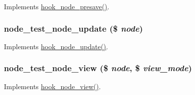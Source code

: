 \label{node__test_8module_a5dc9a5a8b514e3717ac1533d79fa0077}
Implements \hyperlink{group__node__api__hooks_gab339b1a1ce0e235d4a9c5a05e410dcd6}{hook\_\-node\_\-presave()}. \hypertarget{node__test_8module_a5db97f3455d3967072e99ff4275327e9}{
\subsubsection[{node\_\-test\_\-node\_\-update}]{\setlength{\rightskip}{0pt plus 5cm}node\_\-test\_\-node\_\-update (\$ {\em node})}}
\label{node__test_8module_a5db97f3455d3967072e99ff4275327e9}
Implements \hyperlink{group__node__api__hooks_gac66c767cc922fcbfdaf17252e5d87d9d}{hook\_\-node\_\-update()}. \hypertarget{node__test_8module_a7a0e0b7d9827ab5e62af39ecc0c3c0fd}{
\subsubsection[{node\_\-test\_\-node\_\-view}]{\setlength{\rightskip}{0pt plus 5cm}node\_\-test\_\-node\_\-view (\$ {\em node}, \/  \$ {\em view\_\-mode})}}
\label{node__test_8module_a7a0e0b7d9827ab5e62af39ecc0c3c0fd}
Implements \hyperlink{group__node__api__hooks_ga475290ee8e81a2373ea17c512cc3f9a9}{hook\_\-node\_\-view()}. 